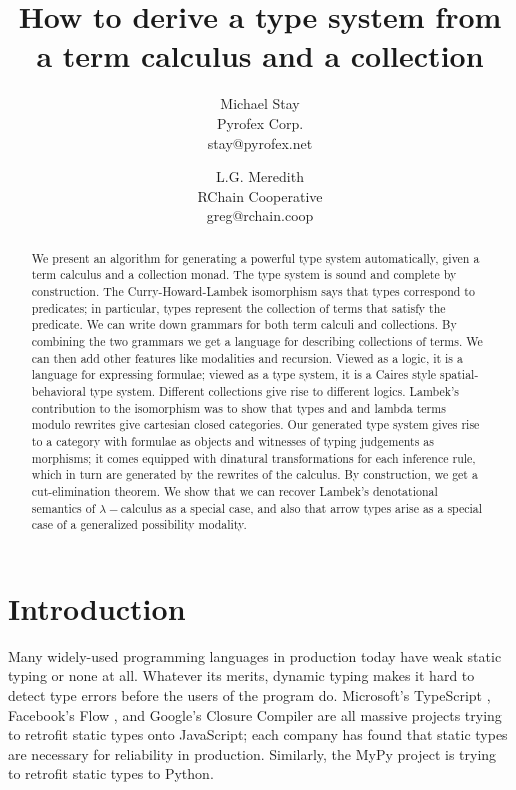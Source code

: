 \documentclass[a4paper,UKenglish]{article}
\begin{document}
\title{How to derive a type system from a term calculus and a collection}
\author{
Michael Stay\\
  {Pyrofex Corp.}\\
  {\fontsize{8}{8}\selectfont stay@pyrofex.net}\\
  \and
  L.G. Meredith\\
  {RChain Cooperative}\\
  {\fontsize{8}{8}\selectfont greg@rchain.coop}
}
\maketitle
\begin{abstract}
  \noindent We present an algorithm for generating a powerful type system automatically, given a term calculus and a collection monad.  The type system is sound and complete by construction.  The Curry-Howard-Lambek isomorphism says that types correspond to predicates; in particular, types represent the collection of terms that satisfy the predicate.  We can write down grammars for both term calculi and collections. By combining the two grammars we get a language for describing collections of terms.  We can then add other features like modalities and recursion.  Viewed as a logic, it is a language for expressing formulae; viewed as a type system, it is a Caires style spatial-behavioral type system.  Different collections give rise to different logics.  Lambek's contribution to the isomorphism was to show that types and and lambda terms modulo rewrites give cartesian closed categories.  Our generated type system gives rise to a category with formulae as objects and witnesses of typing judgements as morphisms; it comes equipped with dinatural transformations for each inference rule, which in turn are generated by the rewrites of the calculus.  By construction, we get a cut-elimination theorem.  We show that we can recover Lambek's denotational semantics of $\lambda-$calculus as a special case, and also that arrow types arise as a special case of a generalized possibility modality.
\end{abstract}

\EnableBpAbbreviations

\section{Introduction}

Many widely-used programming languages in production today have weak static typing or none at all.  Whatever its merits, dynamic typing makes it hard to detect type errors before the users of the program do.  Microsoft's TypeScript \cite{TypeScript},
Facebook's Flow \cite{Flow}, 
and Google's Closure Compiler \cite{Closure}
are all massive projects trying to retrofit static types onto JavaScript; each company has found that static types are necessary for reliability in production.  Similarly, the MyPy project \cite{MyPy}
is trying to retrofit static types to Python.
\end{document}
